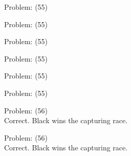 \documentclass[11pt]{article}
\begin{document}
\begin{minipage}[t]{0.5\textwidth}
  {\centering
  
  Problem: (55)\\
  
  }
\end{minipage}
\begin{minipage}[t]{0.5\textwidth}
  {\centering
  
  Problem: (55)\\
  
  }
\end{minipage}
\begin{minipage}[t]{0.5\textwidth}
  {\centering
  
  Problem: (55)\\
  
  }
\end{minipage}
\begin{minipage}[t]{0.5\textwidth}
  {\centering
  
  Problem: (55)\\
  
  }
\end{minipage}
\begin{minipage}[t]{0.5\textwidth}
  {\centering
  
  Problem: (55)\\
  
  }
\end{minipage}
\begin{minipage}[t]{0.5\textwidth}
  {\centering
  
  Problem: (55)\\
  
  }
\end{minipage}
\begin{minipage}[t]{0.5\textwidth}
  {\centering
  
  Problem: (56)\\
  Correct. Black wins the capturing race.\\
  }
\end{minipage}
\begin{minipage}[t]{0.5\textwidth}
  {\centering
  
  Problem: (56)\\
  Correct. Black wins the capturing race.\\
  }
\end{minipage}
\end{document}
